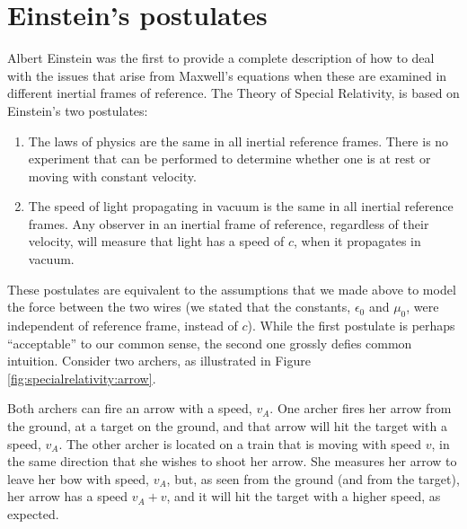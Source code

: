 \section{Einstein's postulates}
Albert Einstein was the first to provide a complete description of how to deal with the issues that arise from Maxwell's equations when these are examined in different inertial frames of reference. The Theory of Special Relativity, is based on Einstein's two postulates:
\begin{enumerate}
\item The laws of physics are the same in all inertial reference frames. There is no experiment that can be performed to determine whether one is at rest or moving with constant velocity.
\item The speed of light propagating in vacuum is the same in all inertial reference frames. Any observer in an inertial frame of reference, regardless of their velocity, will measure that light has a speed of $c$, when it propagates in vacuum. 
\end{enumerate}
These postulates are equivalent to the assumptions that we made above to model the force between the two wires (we stated that the constants, $\epsilon_0$ and $\mu_0$, were independent of reference frame, instead of $c$). While the first postulate is perhaps ``acceptable'' to our common sense, the second one grossly defies common intuition. Consider two archers, as illustrated in Figure \ref{fig:specialrelativity:arrow}.

Both archers can fire an arrow with a speed, $v_A$. One archer fires her arrow from the ground, at a target on the ground, and that arrow will hit the target with a speed, $v_A$. The other archer is located on a train that is moving with speed $v$, in the same direction that she wishes to shoot her arrow. She measures her arrow to leave her bow with speed, $v_A$, but, as seen from the ground (and from the target), her arrow has a speed $v_A+v$, and it will hit the target with a higher speed, as expected.

